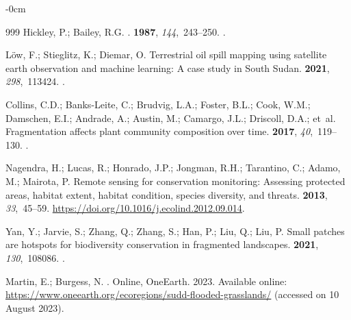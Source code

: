 \documentclass[analytics,article,accept,pdftex,moreauthors]{Definitions/mdpi}
\begin{document}
\begin{adjustwidth}{-\extralength}{0cm}
\begin{thebibliography}{999}
Hickley, P.; Bailey, R.G.
.
 {\bf 1987}, {\em 144},~243--250.
.

Löw, F.; Stieglitz, K.; Diemar, O.
\newblock Terrestrial oil spill mapping using satellite earth observation and
  machine learning: A case study in South Sudan.
 {\bf 2021}, {\em
  298},~113424.
.

Collins, C.D.; Banks-Leite, C.; Brudvig, L.A.; Foster, B.L.; Cook, W.M.;
  Damschen, E.I.; Andrade, A.; Austin, M.; Camargo, J.L.; Driscoll, D.A.;
  et~al.
\newblock Fragmentation affects plant community composition over time.
 {\bf 2017}, {\em 40},~119--130.
.

Nagendra, H.; Lucas, R.; Honrado, J.P.; Jongman, R.H.; Tarantino, C.; Adamo,
  M.; Mairota, P.
\newblock Remote sensing for conservation monitoring: Assessing protected
  areas, habitat extent, habitat condition, species diversity, and threats.
 {\bf 2013}, {\em 33},~45--59.
\newblock %
  {\url{https://doi.org/10.1016/j.ecolind.2012.09.014}}.

Yan, Y.; Jarvie, S.; Zhang, Q.; Zhang, S.; Han, P.; Liu, Q.; Liu, P.
\newblock Small patches are hotspots for biodiversity conservation in
  fragmented landscapes.
 {\bf 2021}, {\em 130},~108086.
.

Martin, E.; Burgess, N.
.
\newblock Online, OneEarth.  2023.
\newblock Available online: \url{https://www.oneearth.org/ecoregions/sudd-flooded-grasslands/} (accessed on 10 August 2023). %


\end{thebibliography}
\end{adjustwidth}
\end{document}
